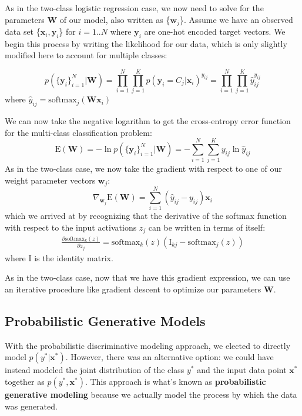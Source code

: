 As in the two-class logistic regression case, we now need to solve for the parameters \textbf{W} of our model, also written as \{$\textbf{w}_{j}$\}. Assume we have an observed data set \{$\textbf{x}_{i}, \textbf{y}_{i}$\} for $i=1..N$ where $\textbf{y}_{i}$ are one-hot encoded target vectors.  We begin this process by writing the likelihood for our data, which is only slightly modified here to account for multiple classes:

\begin{equation} \label{multi-class-log-reg-likelihood}
	p(\{\textbf{y}_{i}\}_{i=1}^{N}|\textbf{W}) = \prod_{i=1}^{N}\prod_{j=1}^{K} p(\textbf{y}_{i}=C_{j}|\textbf{x}_{i})^{y_{ij}} = \prod_{i=1}^{N}\prod_{j=1}^{K} \hat{y}_{ij}^{y_{ij}}
\end{equation}
where $\hat{y}_{ij} = \text{softmax}_{j}(\textbf{W}\textbf{x}_{i})$ \newline

We can now take the negative logarithm to get the cross-entropy error function for the multi-class classification problem:
\begin{equation} \label{multi-class-cross-entropy-error-fn}
	\mathrm{E}(\textbf{W}) = - \ln{p(\{\textbf{y}_{i}\}_{i=1}^{N}|\textbf{W})} = - \sum_{i=1}^{N}\sum_{j=1}^{K} y_{ij} \ln{\hat{y}_{ij}}
\end{equation}
As in the two-class case, we now take the gradient with respect to one of our weight parameter vectors $\textbf{w}_{j}$:
\begin{equation} \label{multi-class-log-reg-gradient}
	\nabla_{\textbf{w}_{j}} \mathrm{E}(\textbf{W}) = \sum_{i=1}^{N}(\hat{y}_{ij} - y_{ij})\textbf{x}_{i}
\end{equation}
which we arrived at by recognizing that the derivative of the softmax function with respect to the input activations $z_{j}$ can be written in terms of itself:
\begin{align*}
	\frac{\partial \text{softmax}_{k}(z)}{\partial z_{j}} = \text{softmax}_{k}(z)(\mathrm{I}_{kj} - \text{softmax}_{j}(z))
\end{align*}
where $\mathrm{I}$ is the identity matrix.

As in the two-class case, now that we have this gradient expression, we can use an iterative procedure like gradient descent to optimize our parameters $\textbf{W}$.

\subsection{Probabilistic Generative Models}
With the probabilistic discriminative modeling approach, we elected to directly model $p(y^{*}|\textbf{x}^{*})$. However, there was an alternative option: we could have instead modeled the joint distribution of the class $y^{*}$ and the input data point $\textbf{x}^{*}$ together as $p(y^{*}, \textbf{x}^{*})$. This approach is what's known as \textbf{probabilistic generative modeling} because we actually model the process by which the data was generated.

